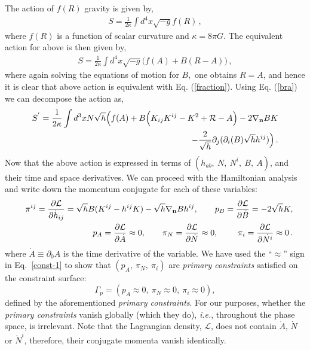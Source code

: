 \documentclass[a4paper,12pt]{article}
\newcommand{\bn}{\bold{n}}
\newcommand{\Ga}{\Gamma}
\newcommand{\+}{^{\dagger}}
\newcommand{\2}{\frac{1}{2}}
\newcommand{\3}{\frac{1}{3}}
\newcommand{\4}{\frac{1}{4}}
\newcommand{\6}{\frac{1}{6}}
\newcommand{\8}{\frac{1}{8}}
\begin{document}
The action of $f(R)$ gravity is given by, 
\begin{eqnarray}\label{fraction}
S=\frac{1}{2\kappa}\int d^{4}x\sqrt{-g}f(R)\,,
\end{eqnarray}
where $f(R)$ is a function of scalar curvature and $\kappa=8\pi G$. The equivalent action for above is then given by, 
\begin{eqnarray}
S=\frac{1}{2\kappa}\int d^{4}x\sqrt{-g}\Big(f(A)+B(R-A)\Big)\,,
\end{eqnarray}
where again solving the equations of motion for $B,$ one obtains $R=A$, and hence it is clear that above action is equivalent 
with Eq. (\ref{fraction}). Using Eq. (\ref{bra}) we can  decompose the action as,
\begin{eqnarray}
S^{'}=\frac{1}{2\kappa}\int d^{3}xN\sqrt{h}\Big(f(A)+B\Big(K_{ij}K^{ij}-K^2+\mathcal{R}-A\Big)-2\nabla_\bn
BK\nonumber \\
-\frac{2}{\sqrt{h}}\partial_j(\partial_i(B)\sqrt{h}h^{ij}
)\Big)\,.
\end{eqnarray}
Now that the above  action is expressed in terms of $(h_{ab},~N,~N^i,~B,~A)$, and their time and space derivatives. 
We can proceed with the Hamiltonian analysis and write down the momentum conjugate for each of these variables:
\begin{eqnarray}\label{const-1}
&&\pi^{ij}=\frac{\partial\mathcal{L}}{\partial\dot{h}_{ij}}=\sqrt{h}B(K^{ij}-h^{ij}K)-\sqrt{h}\nabla_\bn Bh^{ij},\qquad p_B=\frac{\partial\mathcal{L}}{\partial\dot{B}}=-2\sqrt{h}K,\nonumber\\
&&p_A=\frac{\partial\mathcal{L}}{\partial\dot{A}}\approx0, \qquad\pi_N=\frac{\partial\mathcal{L}}{\partial\dot{N}}\approx0,\qquad\ \pi_i=\frac{\partial\mathcal{L}}{\partial\dot{N^i}}\approx0\,.
\end{eqnarray}
where $\dot{A}\equiv\partial_0A$ is the time derivative of the variable.
We have used the ``$\approx$'' sign in Eq.~\eqref{const-1} to show that $(p_A,~\pi_N,~\pi_i)$ are \textit{primary constraints} satisfied on the constraint surface: $$\Ga_p=(p_A \approx 0,~\pi_N\approx 0,~\pi_i \approx 0),$$ defined by the aforementioned {\it primary constraints}. For our purposes, whether the {\it primary constraints} vanish globally (which they do), \textit{i.e.}, throughout the phase space, is irrelevant. Note that the Lagrangian density, $\mathcal{L}$, does not contain  $\dot A$, $\dot N$ or $\dot N^i$, therefore, 
their conjugate momenta vanish identically. 
\end{document}
